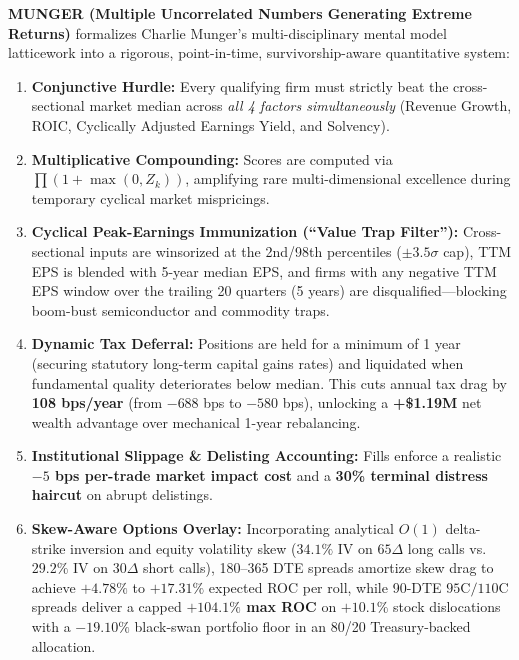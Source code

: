 \documentclass[10pt,twocolumn]{article}
\begin{document}
\textbf{MUNGER (Multiple Uncorrelated Numbers Generating Extreme Returns)} formalizes Charlie Munger's multi-disciplinary mental model latticework into a rigorous, point-in-time, survivorship-aware quantitative system:
\begin{enumerate}
    \item \textbf{Conjunctive Hurdle:} Every qualifying firm must strictly beat the cross-sectional market median across \textit{all 4 factors simultaneously} (Revenue Growth, ROIC, Cyclically Adjusted Earnings Yield, and Solvency).
    \item \textbf{Multiplicative Compounding:} Scores are computed via $\prod (1 + \max(0, Z_k))$, amplifying rare multi-dimensional excellence during temporary cyclical market mispricings.
    \item \textbf{Cyclical Peak-Earnings Immunization (``Value Trap Filter''):} Cross-sectional inputs are winsorized at the 2nd/98th percentiles ($\pm 3.5\sigma$ cap), TTM EPS is blended with 5-year median EPS, and firms with any negative TTM EPS window over the trailing 20 quarters (5 years) are disqualified---blocking boom-bust semiconductor and commodity traps.
    \item \textbf{Dynamic Tax Deferral:} Positions are held for a minimum of 1 year (securing statutory long-term capital gains rates) and liquidated when fundamental quality deteriorates below median. This cuts annual tax drag by \textbf{108 bps/year} (from $-688$ bps to $-580$ bps), unlocking a \textbf{+\$1.19M} net wealth advantage over mechanical 1-year rebalancing.
    \item \textbf{Institutional Slippage \& Delisting Accounting:} Fills enforce a realistic \textbf{$-5$ bps per-trade market impact cost} and a \textbf{30\% terminal distress haircut} on abrupt delistings.
    \item \textbf{Skew-Aware Options Overlay:} Incorporating analytical $O(1)$ delta-strike inversion and equity volatility skew ($34.1\%$ IV on $65\Delta$ long calls vs.\ $29.2\%$ IV on $30\Delta$ short calls), 180--365 DTE spreads amortize skew drag to achieve $+4.78\%$ to $+17.31\%$ expected ROC per roll, while 90-DTE $95\text{C}/110\text{C}$ spreads deliver a capped \textbf{$+104.1\%$ max ROC} on $+10.1\%$ stock dislocations with a $-19.10\%$ black-swan portfolio floor in an 80/20 Treasury-backed allocation.
\end{enumerate}
\end{document}
